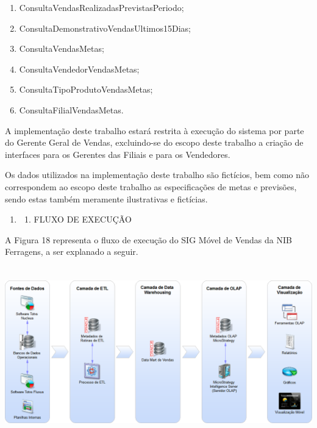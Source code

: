 \documentclass[a4paper]{article}
\newcommand\liststyleWWviiiNumi{%
\renewcommand\theenumi{\arabic{enumi}}
\renewcommand\theenumii{\arabic{enumi}.\arabic{enumii}}
\renewcommand\theenumiii{\arabic{enumi}.\arabic{enumii}.\arabic{enumiii}}
\renewcommand\theenumiv{\arabic{enumi}.\arabic{enumii}.\arabic{enumiii}.\arabic{enumiv}}
\renewcommand\labelenumi{\theenumi}
\renewcommand\labelenumii{\theenumii}
\renewcommand\labelenumiii{\theenumiii}
\renewcommand\labelenumiv{\theenumiv.}
}
\newcommand\liststyleWWviiiNumx{%
\renewcommand\theenumi{\alph{enumi}}
\renewcommand\theenumii{\alph{enumii}}
\renewcommand\theenumiii{\roman{enumiii}}
\renewcommand\theenumiv{\arabic{enumiv}}
\renewcommand\labelenumi{\theenumi)}
\renewcommand\labelenumii{\theenumii.}
\renewcommand\labelenumiii{\theenumiii.}
\renewcommand\labelenumiv{\theenumiv.}
}
\begin{document}
\liststyleWWviiiNumx
\begin{enumerate}
\item {
\textsf{ConsultaVendasRealizadasPrevistasPeriodo;}}
\item {
\textsf{ConsultaDemonstrativoVendasUltimos15Dias;}}
\item {
\textsf{ConsultaVendasMetas;}}
\item {
\textsf{ConsultaVendedorVendasMetas;}}
\item {
\textsf{ConsultaTipoProdutoVendasMetas;}}
\item {
\textsf{ConsultaFilialVendasMetas.}}
\end{enumerate}
{\sffamily
A implementa\c{c}\~ao deste trabalho estar\'a restrita \`a execu\c{c}\~ao do sistema por parte do Gerente Geral de
Vendas, excluindo-se do escopo deste trabalho a cria\c{c}\~ao de interfaces para os Gerentes das Filiais e para os
Vendedores.}

{
\textsf{Os dados utilizados na implementa\c{c}\~ao deste trabalho s\~ao fict\'icios, bem como n\~ao correspondem ao
escopo deste trabalho as especifica\c{c}\~oes de metas e previs\~oes, sendo estas tamb\'em meramente ilustrativas e
fict\'icias.}}


\bigskip

\liststyleWWviiiNumi
\begin{enumerate}
\item \begin{enumerate}
\item {\sffamily
FLUXO DE EXECU\c{C}\~AO }
\end{enumerate}
\end{enumerate}
{
\textsf{A Figura 18 representa o fluxo de execu\c{c}\~ao do SIG M\'ovel de Vendas da NIB Ferragens, a ser explanado a
seguir.}}

\newline
 \includegraphics[width=15.977cm,height=7.428cm]{monograph-img018.png} 
\end{document}
